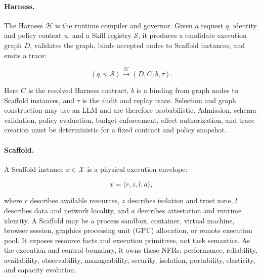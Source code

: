 \paragraph{Harness.}
The Harness $\mathcal{H}$ is the runtime compiler and governor. Given a request $q$, identity and policy context $u$, and a Skill registry $\mathcal{S}$, it produces a candidate execution graph $D$, validates the graph, binds accepted nodes to Scaffold instances, and emits a trace:

\begin{equation}
(q,u,\mathcal{S}) \xrightarrow{\mathcal{H}} (D,C,b,\tau).
\end{equation}

Here $C$ is the resolved Harness contract, $b$ is a binding from graph nodes to Scaffold instances, and $\tau$ is the audit and replay trace. Selection and graph construction may use an LLM and are therefore probabilistic. Admission, schema validation, policy evaluation, budget enforcement, effect authorization, and trace creation must be deterministic for a fixed contract and policy snapshot.

\paragraph{Scaffold.}
A Scaffold instance $x\in\mathcal{X}$ is a physical execution envelope:

\begin{equation}
x=\langle r,z,l,a\rangle,
\end{equation}

where $r$ describes available resources, $z$ describes isolation and trust zone, $l$ describes data and network locality, and $a$ describes attestation and runtime identity. A Scaffold may be a process sandbox, container, virtual machine, browser session, graphics processing unit (GPU) allocation, or remote execution pool. It exposes resource facts and execution primitives, not task semantics. As the execution and control boundary, it owns these NFRs: performance, reliability, availability, observability, manageability, security, isolation, portability, elasticity, and capacity evolution.

